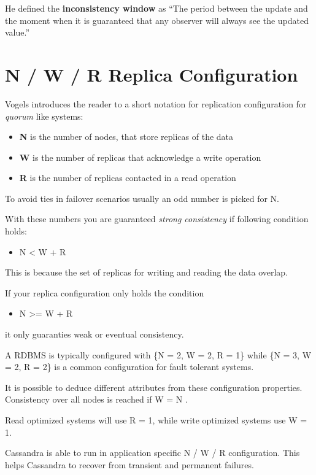 He defined the \textbf{inconsistency window} as
``The period between the update and the moment when it is guaranteed that any observer will always see the updated value.''

\section{N / W / R Replica Configuration}

Vogels introduces the reader to a short notation for replication
configuration for \emph{quorum} like systems:

\begin{itemize}
\item
  \textbf{N} is the number of nodes, that store replicas of the data
\item
  \textbf{W} is the number of replicas that acknowledge a write
  operation
\item
  \textbf{R} is the number of replicas contacted in a read operation
\end{itemize}
To avoid ties in failover scenarios usually an odd number is picked
for N.

With these numbers you are guaranteed \emph{strong consistency} if
following condition holds:

\begin{itemize}
\item
  N \textless{} W + R
\end{itemize}
This is because the set of replicas for writing and reading the
data overlap.

If your replica configuration only holds the condition

\begin{itemize}
\item
  N \textgreater{}= W + R
\end{itemize}
it only guaranties weak or eventual consistency.

A RDBMS is typically configured with \{N = 2, W = 2, R = 1\} while
\{N = 3, W = 2, R = 2\} is a common configuration for fault
tolerant systems.

It is possible to deduce different attributes from these
configuration properties. Consistency over all nodes is reached if
W = N .

Read optimized systems will use R = 1, while write optimized
systems use W = 1.

Cassandra is able to run in application specific N / W / R
configuration. This helps Cassandra to recover from transient and
permanent failures.

